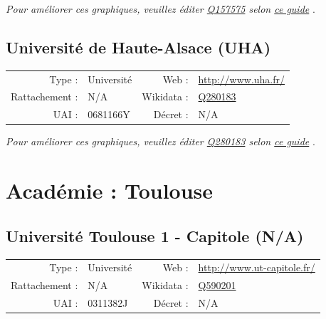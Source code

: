 \documentclass[12pt,french,landscape]{article}
\begin{document}
\textit{\scriptsize Pour améliorer ces graphiques, veuillez éditer \href{https://www.wikidata.org/entity/Q157575}{Q157575}  selon \href{https://github.com/cpesr/wikidataESR/blob/master/Rmd/wikidataESR.md}{ce guide}}
.


\newpage

\hypertarget{universituxe9-de-haute-alsace-uha}{%
\subsection{Université de Haute-Alsace
(UHA)}\label{universituxe9-de-haute-alsace-uha}}

\begin{tabular*}{0.45\textwidth}{rp{2cm}rl}  
\hline  
Type : & Université & Web : &\href{http://www.uha.fr/}{http://www.uha.fr/} \\  
Rattachement : & N/A & Wikidata : & \href{https://www.wikidata.org/entity/Q280183}{Q280183} \\  
UAI : & 0681166Y & Décret : & N/A \\  
\hline  
\end{tabular*}

\textit{\scriptsize Pour améliorer ces graphiques, veuillez éditer \href{https://www.wikidata.org/entity/Q280183}{Q280183}  selon \href{https://github.com/cpesr/wikidataESR/blob/master/Rmd/wikidataESR.md}{ce guide}}
.


\newpage

\hypertarget{acaduxe9mie-toulouse}{%
\section{Académie : Toulouse}\label{acaduxe9mie-toulouse}}

\hypertarget{universituxe9-toulouse-1---capitole-na}{%
\subsection{Université Toulouse 1 - Capitole
(N/A)}\label{universituxe9-toulouse-1---capitole-na}}

\begin{tabular*}{0.45\textwidth}{rp{2cm}rl}  
\hline  
Type : & Université & Web : &\href{http://www.ut-capitole.fr/}{http://www.ut-capitole.fr/} \\  
Rattachement : & N/A & Wikidata : & \href{https://www.wikidata.org/entity/Q590201}{Q590201} \\  
UAI : & 0311382J & Décret : & N/A \\  
\hline  
\end{tabular*}
\end{document}
